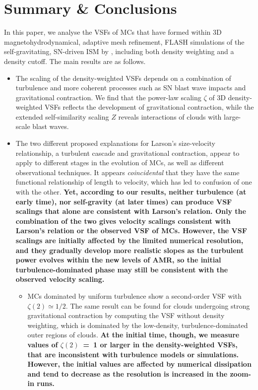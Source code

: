 \section{Summary \& Conclusions}\label{conclusions}

In this paper, we analyse the VSFs of MCs that have formed within 3D magnetohydrodynamical, adaptive mesh refinement, FLASH simulations of the self-gravitating, SN-driven ISM by , including both density weighting and a density cutoff.
The main results are as follows.

\begin{itemize}
	\item The scaling of the density-weighted VSFs depends on a combination of turbulence and more coherent processes such as SN blast wave impacts and gravitational contraction.
    We find that the power-law scaling $\zeta$ of 3D density-weighted VSFs reflects the development of gravitational contraction, while the extended self-similarity scaling $Z$ reveals interactions of clouds with large-scale blast waves.
    \item The two different proposed explanations for Larson's size-velocity relationship, a turbulent cascade and gravitational contraction,  appear to apply to different stages in the evolution of MCs, as well as different observational techniques. It appears {\em coincidental} that they have the same functional relationship of length to velocity, which has led to confusion of one with the other.
    \textbf{Yet, according to our results, neither turbulence (at early time), nor self-gravity (at later times) can produce VSF scalings that alone are consistent with Larson's relation. 
    Only the combination of the two gives velocity scalings consistent with Larson's relation or the observed VSF of MCs. 
    However, the VSF scalings are initially affected by the limited numerical resolution, and they gradually develop more realistic slopes as the turbulent power evolves within the new levels of AMR, so the initial turbulence-dominated phase may still be consistent with the observed velocity scaling.
    }
    \begin{itemize}
        \item MCs dominated by uniform turbulence show a second-order VSF with $\zeta(2) \simeq 1/2$. 
        The same result can be found for clouds undergoing strong gravitational contraction by computing the VSF without density weighting, which is dominated by the low-density, turbulence-dominated outer regions of clouds.
        \textbf{At the initial time, though, we measure values of $\zeta(2)$~=~1 or larger in the density-weighted VSFs, that are inconsistent with turbulence models or simulations. However, the initial values are affected by numerical dissipation and tend to decrease as the resolution is increased in the zoom-in runs.}

\end{itemize}
\end{itemize}

